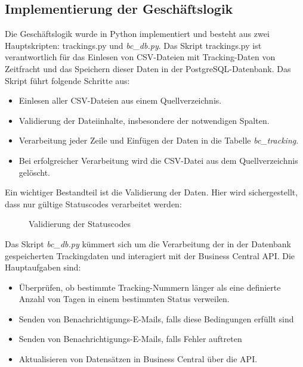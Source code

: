 \subsection{Implementierung der Geschäftslogik}
\label{sec:Geschaeftslogik}

Die Geschäftslogik wurde in Python implementiert und besteht aus zwei Hauptskripten: trackings.py und \textit{bc\_db.py}. 
Das Skript trackings.py ist verantwortlich für das Einlesen von CSV-Dateien mit Tracking-Daten von Zeitfracht und das 
Speichern dieser Daten in der PostgreSQL-Datenbank. Das Skript führt folgende Schritte aus:
\begin{itemize}
    \item Einlesen aller CSV-Dateien aus einem Quellverzeichnis.
    \item Validierung der Dateiinhalte, insbesondere der notwendigen Spalten.
    \item Verarbeitung jeder Zeile und Einfügen der Daten in die Tabelle \textit{bc\_tracking}.
    \item Bei erfolgreicher Verarbeitung wird die CSV-Datei aus dem Quellverzeichnis gelöscht.
\end{itemize}


Ein wichtiger Bestandteil ist die Validierung der Daten. Hier wird sichergestellt, dass nur gültige
Statuscodes verarbeitet werden:	

\begin{figure}[htb]
    \centering
    \caption{Validierung der Statuscodes}
    \label{fig:validateRow}
\end{figure}

Das Skript \textit{bc\_db.py} kümmert sich um die Verarbeitung der in der Datenbank gespeicherten Trackingdaten und 
interagiert mit der Business Central API. 
Die Hauptaufgaben sind:

\begin{itemize}
    \item Überprüfen, ob bestimmte Tracking-Nummern länger als eine definierte Anzahl von Tagen in einem bestimmten Status verweilen.
    \item Senden von Benachrichtigungs-E-Mails, falls diese Bedingungen erfüllt sind
    \item Senden von Benachrichtigungs-E-Mails, falls Fehler auftreten
    \item Aktualisieren von Datensätzen in Business Central über die API.
\end{itemize}


